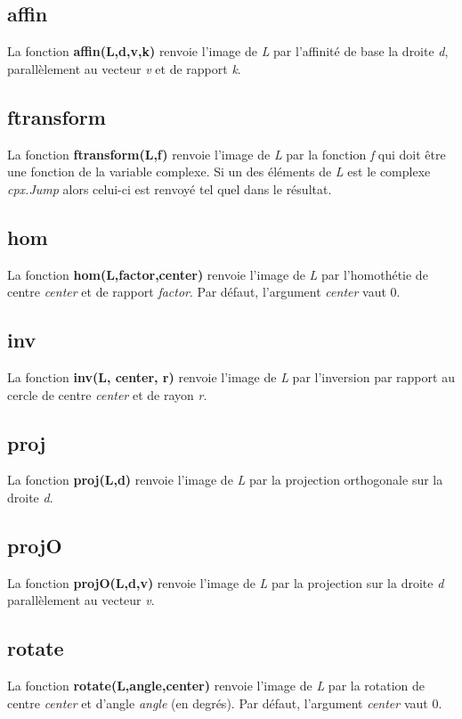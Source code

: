\subsection{affin}
La fonction \textbf{affin(L,d,v,k)} renvoie l'image de \emph{L} par l'affinité de base la droite \emph{d}, parallèlement au vecteur \emph{v} et de rapport \emph{k}.

\subsection{ftransform}
La fonction \textbf{ftransform(L,f)} renvoie l'image de \emph{L} par la fonction \emph{f} qui doit être une fonction de la variable complexe. Si un des éléments de \emph{L} est le complexe \emph{cpx.Jump} alors celui-ci est renvoyé tel quel dans le résultat.

\subsection{hom}
La fonction \textbf{hom(L,factor,center)} renvoie l'image de \emph{L} par l'homothétie de centre \emph{center} et de rapport \emph{factor}. Par défaut, l'argument \emph{center} vaut 0.

\subsection{inv}
La fonction \textbf{inv(L, center, r)} renvoie l'image de \emph{L} par l'inversion par rapport au cercle de centre \emph{center} et de rayon \emph{r}.

\subsection{proj}
La fonction \textbf{proj(L,d)} renvoie l'image de \emph{L} par la projection orthogonale sur la droite \emph{d}.

\subsection{projO}
La fonction \textbf{projO(L,d,v)} renvoie l'image de \emph{L} par la projection sur la droite \emph{d} parallèlement au vecteur \emph{v}.

\subsection{rotate}
La fonction \textbf{rotate(L,angle,center)} renvoie l'image de \emph{L} par la rotation de centre \emph{center} et d'angle \emph{angle} (en degrés). Par défaut, l'argument \emph{center} vaut 0.  


